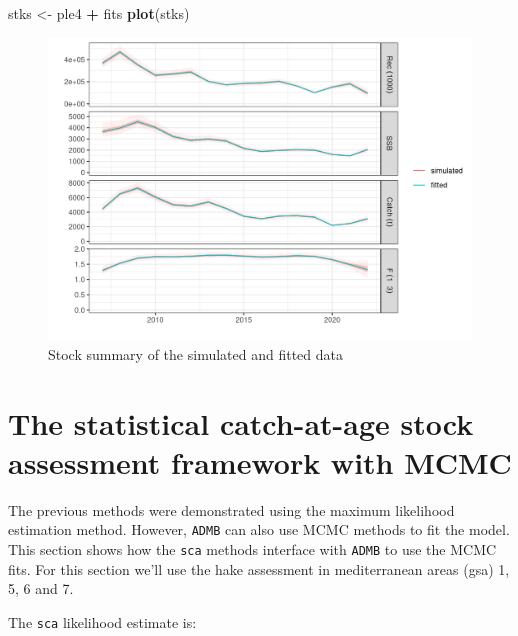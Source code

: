 \documentclass[
]{book}
\newenvironment{Shaded}{\begin{snugshade}}{\end{snugshade}}
\newcommand{\FunctionTok}[1]{\textcolor[rgb]{0.13,0.29,0.53}{\textbf{#1}}}
\newcommand{\NormalTok}[1]{#1}
\newcommand{\OtherTok}[1]{\textcolor[rgb]{0.56,0.35,0.01}{#1}}
\newcommand{\SpecialCharTok}[1]{\textcolor[rgb]{0.81,0.36,0.00}{\textbf{#1}}}
\begin{document}
\begin{Shaded}
\begin{Highlighting}[]
\NormalTok{stks }\OtherTok{\textless{}{-}}\NormalTok{ ple4 }\SpecialCharTok{+}\NormalTok{ fits}
\FunctionTok{plot}\NormalTok{(stks)}
\end{Highlighting}
\end{Shaded}

\begin{figure}
\centering
\includegraphics{_bookdown_files/_main_files/figure-html/sim2-1.png}
\caption{\label{fig:sim2}Stock summary of the simulated and fitted data}
\end{figure}

\hypertarget{the-statistical-catch-at-age-stock-assessment-framework-with-mcmc}{%
\chapter{\texorpdfstring{The statistical catch-at-age stock assessment framework with MCMC \label{sec:mcmc}}{The statistical catch-at-age stock assessment framework with MCMC }}\label{the-statistical-catch-at-age-stock-assessment-framework-with-mcmc}}

The previous methods were demonstrated using the maximum likelihood estimation method. However, \texttt{ADMB} can also use MCMC methods to fit the model. This section shows how the \texttt{sca} methods interface with \texttt{ADMB} to use the MCMC fits. For this section we'll use the hake assessment in mediterranean areas (gsa) 1, 5, 6 and 7.

The \texttt{sca} likelihood estimate is:
\end{document}
